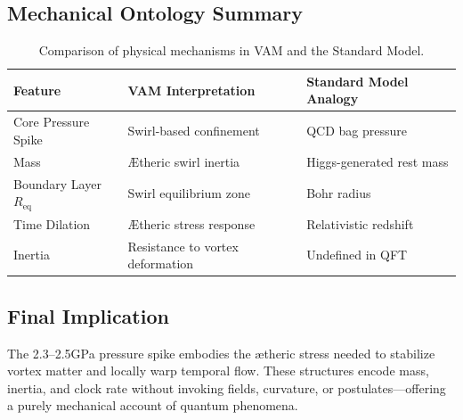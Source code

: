 \subsection{Mechanical Ontology Summary}

\begin{table}[H]
    \centering
    \begin{tabular}{|l|l|l|}
        \hline
        \textbf{Feature} & \textbf{VAM Interpretation} & \textbf{Standard Model Analogy} \\
        \hline
        Core Pressure Spike & Swirl-based confinement & QCD bag pressure \\
        Mass & Ætheric swirl inertia & Higgs-generated rest mass \\
        Boundary Layer \( R_{\text{eq}} \) & Swirl equilibrium zone & Bohr radius \\
        Time Dilation & Ætheric stress response & Relativistic redshift \\
        Inertia & Resistance to vortex deformation & Undefined in QFT \\
        \hline
    \end{tabular}
    \caption{Comparison of physical mechanisms in VAM and the Standard Model.}
\end{table}

\subsection*{Final Implication}

The 2.3–2.5GPa pressure spike embodies the ætheric stress needed to stabilize vortex matter and locally warp temporal flow. These structures encode mass, inertia, and clock rate without invoking fields, curvature, or postulates—offering a purely mechanical account of quantum phenomena.

